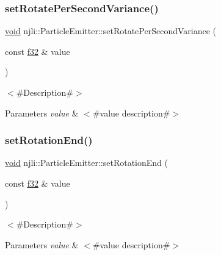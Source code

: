\subsubsection{\texorpdfstring{set\+Rotate\+Per\+Second\+Variance()}{setRotatePerSecondVariance()}}
{\footnotesize\ttfamily \mbox{\hyperlink{_thread_8h_af1e856da2e658414cb2456cb6f7ebc66}{void}} njli\+::\+Particle\+Emitter\+::set\+Rotate\+Per\+Second\+Variance (\begin{DoxyParamCaption}\item[{const \mbox{\hyperlink{_util_8h_a5f6906312a689f27d70e9d086649d3fd}{f32}} \&}]{value }\end{DoxyParamCaption})}

$<$\#\+Description\#$>$


\begin{DoxyParams}{Parameters}
{\em value} & $<$\#value description\#$>$ \\
\hline
\end{DoxyParams}
\mbox{\label{classnjli_1_1_particle_emitter_a65f0ce3c56d6dab81959a00f38c7a93f}} 
\subsubsection{\texorpdfstring{set\+Rotation\+End()}{setRotationEnd()}}
{\footnotesize\ttfamily \mbox{\hyperlink{_thread_8h_af1e856da2e658414cb2456cb6f7ebc66}{void}} njli\+::\+Particle\+Emitter\+::set\+Rotation\+End (\begin{DoxyParamCaption}\item[{const \mbox{\hyperlink{_util_8h_a5f6906312a689f27d70e9d086649d3fd}{f32}} \&}]{value }\end{DoxyParamCaption})}

$<$\#\+Description\#$>$


\begin{DoxyParams}{Parameters}
{\em value} & $<$\#value description\#$>$ \\
\hline
\end{DoxyParams}
\mbox{\label{classnjli_1_1_particle_emitter_a7aa82ae5e07ac56cce53bdc07334fdb7}} 
